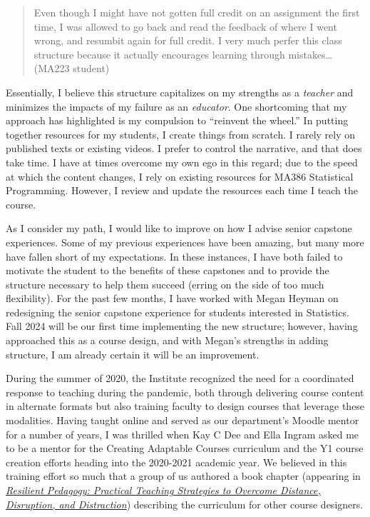 \documentclass[
  letterpaper,
  DIV=11,
  numbers=noendperiod]{scrreprt}
\begin{document}
\begin{quote}
Even though I might have not gotten full credit on an assignment the
first time, I was allowed to go back and read the feedback of where I
went wrong, and resumbit again for full credit. I very much perfer this
class structure because it actually encourages learning through
mistakes\ldots{} (MA223 student)
\end{quote}

Essentially, I believe this structure capitalizes on my strengths as a
\emph{teacher} and minimizes the impacts of my failure as an
\emph{educator}. One shortcoming that my approach has highlighted is my
compulsion to ``reinvent the wheel.'' In putting together resources for
my students, I create things from scratch. I rarely rely on published
texts or existing videos. I prefer to control the narrative, and that
does take time. I have at times overcome my own ego in this regard; due
to the speed at which the content changes, I rely on existing resources
for MA386 Statistical Programming. However, I review and update the
resources each time I teach the course.

As I consider my path, I would like to improve on how I advise senior
capstone experiences. Some of my previous experiences have been amazing,
but many more have fallen short of my expectations. In these instances,
I have both failed to motivate the student to the benefits of these
capstones and to provide the structure necessary to help them succeed
(erring on the side of too much flexibility). For the past few months, I
have worked with Megan Heyman on redesigning the senior capstone
experience for students interested in Statistics. Fall 2024 will be our
first time implementing the new structure; however, having approached
this as a course design, and with Megan's strengths in adding structure,
I am already certain it will be an improvement.

During the summer of 2020, the Institute recognized the need for a
coordinated response to teaching during the pandemic, both through
delivering course content in alternate formats but also training faculty
to design courses that leverage these modalities. Having taught online
and served as our department's Moodle mentor for a number of years, I
was thrilled when Kay C Dee and Ella Ingram asked me to be a mentor for
the Creating Adaptable Courses curriculum and the Y1 course creation
efforts heading into the 2020-2021 academic year. We believed in this
training effort so much that a group of us authored a book chapter
(appearing in
\href{https://uen.pressbooks.pub/resilientpedagogy/}{\emph{Resilient
Pedagogy: Practical Teaching Strategies to Overcome Distance,
Disruption, and Distraction}}) describing the curriculum for other
course designers.
\end{document}
